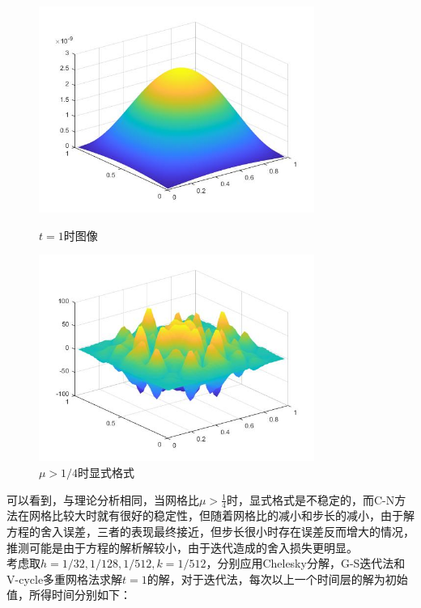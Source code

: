 \documentclass[12pt]{ctexart}
\begin{document}
\begin{figure}[H]
	\centering
	\begin{minipage}[t]{0.48\textwidth}
		\centering
		\includegraphics[width=9cm]{热扩散.jpg}
		\caption{$t=1$时图像}
	\end{minipage}
	\begin{minipage}[t]{0.48\textwidth}
		\centering
		\includegraphics[width=9cm]{显式不稳定.jpg}
		\caption{$\mu>1/4$时显式格式}
	\end{minipage}
\end{figure}

\noindent 可以看到，与理论分析相同，当网格比$\mu > \frac{1}{4}$时，显式格式是不稳定的，而C-N方法在网格比较大时就有很好的稳定性，但随着网格比的减小和步长的减小，由于解方程的舍入误差，三者的表现最终接近，但步长很小时存在误差反而增大的情况，推测可能是由于方程的解析解较小，由于迭代造成的舍入损失更明显。\\
\indent 考虑取$h = 1/32,1/128,1/512,k = 1/512$，分别应用Chelesky分解，G-S迭代法和V-cycle多重网格法求解$t=1$的解，对于迭代法，每次以上一个时间层的解为初始值，所得时间分别如下：\\
\end{document}
